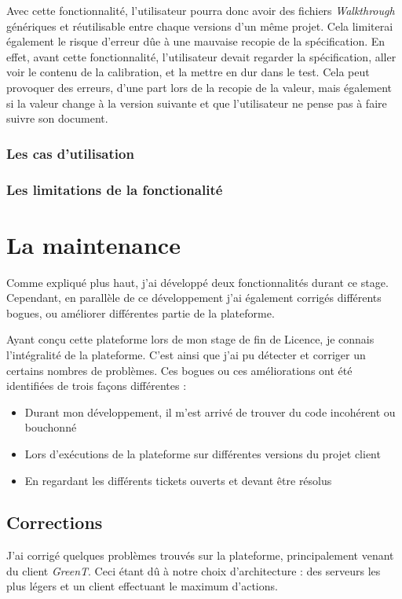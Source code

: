 Avec cette fonctionnalité, l'utilisateur pourra donc avoir des fichiers \textit{Walkthrough} génériques et réutilisable entre chaque versions d'un même projet. Cela limiterai également le risque d'erreur dûe à une mauvaise recopie de la spécification. En effet, avant cette fonctionnalité, l'utilisateur devait regarder la spécification, aller voir le contenu de la calibration, et la mettre en dur dans le test. Cela peut provoquer des erreurs, d'une part lors de la recopie de la valeur, mais également si la valeur change à la version suivante et que l'utilisateur ne pense pas à faire suivre son document. 

\subsubsection{Les cas d'utilisation}
\subsubsection{Les limitations de la fonctionalité}


\section{La maintenance}
Comme expliqué plus haut, j'ai développé deux fonctionnalités durant ce stage. Cependant, en parallèle de ce développement j'ai également corrigés différents bogues, ou améliorer différentes partie de la plateforme.

Ayant conçu cette plateforme lors de mon stage de fin de Licence, je connais l'intégralité de la plateforme. C'est ainsi que j'ai pu détecter et corriger un certains nombres de problèmes. Ces bogues ou ces améliorations ont été identifiées de trois façons différentes : 
\begin{itemize}
	\item Durant mon développement, il m'est arrivé de trouver du code incohérent ou bouchonné
	\item Lors d'exécutions de la plateforme sur différentes versions du projet client
	\item En regardant les différents tickets ouverts et devant être résolus
\end{itemize}

\subsection{Corrections}
J'ai corrigé quelques problèmes trouvés sur la plateforme, principalement venant du client \textit{GreenT}. Ceci étant dû à notre choix d'architecture : des serveurs les plus légers et un client effectuant le maximum d'actions.
